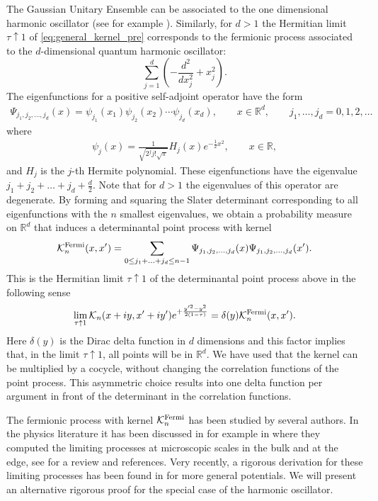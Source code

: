 \documentclass[%
 jmp,
cp,  %
 amsmath,amsthm,amssymb,%
 reprint,%
onecolumn]{revtex4-2}
\begin{document}
The Gaussian Unitary Ensemble can be  associated to the one dimensional harmonic oscillator (see for example \cite{Sosh}). Similarly, for $d>1$ the Hermitian limit $\tau \uparrow 1$ of \eqref{eq:general_kernel_pre} corresponds to the fermionic process associated to the  $d$-dimensional quantum harmonic oscillator:
$$
\sum_{j=1}^d \left(-\frac{d^2}{dx_j^2}+x^2_j\right).
$$
The eigenfunctions for a positive self-adjoint operator have the form
\begin{align}
    \Psi_{j_1,j_2,\ldots,j_d}(x) = \psi_{j_1}(x_1) \psi_{j_2}(x_2) \cdots \psi_{j_d}(x_d), \qquad  x\in \mathbb R^d, \qquad j_1,\ldots,j_d=0,1,2,\ldots
    \end{align}
    where
    \begin{align}
    \psi_j(x) = \frac{1}{\sqrt{2^j j! \sqrt\pi}} H_j(x) e^{-\frac{1}{2} x^2},  \qquad x\in\mathbb R,
    \end{align}
    and $H_j$ is the $j$-th Hermite polynomial. These eigenfunctions have the eigenvalue $j_1+j_2+\ldots+j_d+\frac{d}{2}$. Note that for $d>1$ the eigenvalues of this operator are degenerate. By forming and squaring the Slater determinant corresponding to all eigenfunctions with the $n$ smallest eigenvalues, we obtain  a probability measure on $\mathbb R^d$ that induces a determinantal point process with kernel 
    \begin{equation}\label{eq:kernelferm}
       \mathcal K_n^{\rm Fermi}(x,x')=
    \sum_{0\leq j_1+\ldots+ j_d \leq n-1} \Psi_{j_1,j_2,\ldots,j_d}(x) \Psi_{j_1,j_2,\ldots,j_d}(x').
    \end{equation}
    This is the Hermitian limit $\tau \uparrow 1$ of the determinantal point process above in the following sense 
    \begin{equation}\label{eq:deltalim}
     \lim_{\tau \uparrow 1} \mathcal K_n(x+iy,x'+i y') e^{+\frac{y'^2-y^2}{2(1-\tau)}} =\delta (y) \mathcal K_n^{\rm Fermi}(x,x').
     \end{equation}
Here $\delta(y)$ is the Dirac delta function 
in $d$ dimensions 
and this factor implies that, in the limit $\tau \uparrow 1$, all points will be 
in $\mathbb{R}^d$.
We have used that the kernel can be multiplied by a cocycle, without changing the correlation functions of the point process. This asymmetric choice results into one delta function per argument in front of the determinant in the correlation functions.

The fermionic process with kernel $\mathcal K_n^{\rm Fermi}$ has been studied by several authors. In the physics literature it  has been discussed in  for example in
\cite{KM,DeDoMaSc} where they computed the limiting processes at microscopic scales in the bulk and at the edge, see \cite{DeDoMaSc3} for a review and references.
Very recently, a rigorous derivation for these limiting processes has been found in \cite{DeLa} for more general potentials. We will present an alternative rigorous proof for the special case of the harmonic oscillator. 
\end{document}
